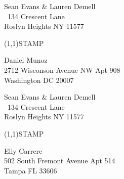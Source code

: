 \documentclass[12pt]{article}
\begin{document}
\begin{minipage}{.5\linewidth} \noindent
Sean Evans \& Lauren Demell\\\ 
134 Crescent Lane\\ 
Roslyn Heights NY 11577
\end{minipage}
\begin{minipage}{.5\linewidth \hspace{-.2in} \vspace{-.3in}}
\begin{flushright}
\framebox(1,1){STAMP}
\end{flushright}
\end{minipage}

\begin{center} \begin{Huge} \vspace*{\fill}
Daniel Munoz\\
2712 Wisconson Avenue NW Apt 908\\
Washington DC 20007\\
\vspace{\fill} \end{Huge} \end{center}

\clearpage

\begin{minipage}{.5\linewidth} \noindent
Sean Evans \& Lauren Demell\\\ 
134 Crescent Lane\\ 
Roslyn Heights NY 11577
\end{minipage}
\begin{minipage}{.5\linewidth \hspace{-.2in} \vspace{-.3in}}
\begin{flushright}
\framebox(1,1){STAMP}
\end{flushright}
\end{minipage}

\begin{center} \begin{Huge} \vspace*{\fill}
Elly Carrere\\
502 South Fremont Avenue Apt 514\\
Tampa FL 33606\\
\vspace{\fill} \end{Huge} \end{center}

\clearpage
\end{document}
